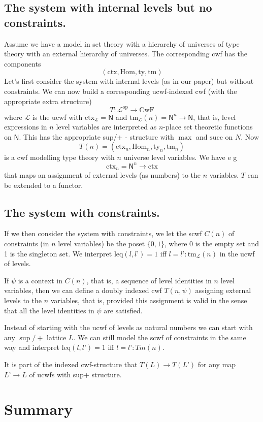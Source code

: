 \documentclass[11pt,a4paper]{article}
\theoremstyle{definition}
\newcommand{\Ctx}{\mathrm{Ctx}}
\newcommand{\Ty}{\mathrm{Ty}}
\newcommand{\Tm}{\mathrm{Tm}}
\newcommand{\op}{\mathrm{op}}
\newcommand{\N}{\mathsf{N}}
\def\Ctx{\mathrm{ctx}}
\def\Ty{\mathrm{ty}}
\def\Tm{\mathrm{tm}}
\def\leq{\mathrm{leq}}
\def\L{{\mathcal{L}}}
\def\CwF{\mathrm{CwF}}
\begin{document}
\subsection{The system with internal levels but no constraints.}
Assume we have a model in set theory with a hierarchy of universes of type theory with an external hierarchy of universes. The corresponding cwf has the components
 $$
(\Ctx, \mathrm{Hom}, \Ty, \Tm)
 $$
Let’s first consider the system with internal levels (as in our paper) but without constraints. We can now build a corresponding ucwf-indexed cwf (with the appropriate extra structure)
 $$
T : \L^{\op} \to \CwF
$$
where $\L$ is the ucwf with $\Ctx_\L = \N$ and $\Tm_\L(n) = \N^n \to \N$, that is, level expressions in $n$ level variables are interpreted as $n$-place set theoretic functions on $\N$. This has the appropriate sup/+ - structure with $\max$ and $\mathrm{succ}$ on $N$. Now
 $$
T(n) = (\Ctx_n, \mathrm{Hom}_n, \Ty_n, \Tm_n)
 $$
is a cwf modelling type theory with $n$ universe level variables. We have e g
 $$
\Ctx_n = \N^n \to \Ctx
 $$
that maps an assignment of external levels (as numbers) to the $n$ variables. $T$ can be extended to a functor.
 
\subsection{The system with constraints.}
If we then consider the system with constraints, we let the scwf $C(n)$ of constraints (in $n$ level variables) be the poset $\{0,1\}$, where 0 is the empty set and 1 is the singleton set. We interpret $\leq(l,l’) = 1$ iff $l = l’ : \Tm_\L(n)$ in the ucwf of levels.
 
If $\psi$ is a context in $C(n)$, that is, a sequence of level identities in $n$ level variables, then we can define a doubly indexed cwf $T(n, \psi)$ assigning external levels to the $n$ variables, that is, provided this assignment is valid in the sense that all the level identities in $\psi$ are satisfied.
 
Instead of starting with the ucwf of levels as natural numbers we can start with any $\sup/+$ lattice $L$.  We can still model the scwf of constraints in the same way and interpret $\leq(l,l’) = 1$ iff $ l = l’ : Tm(n)$.
 
It is part of the indexed cwf-structure that $T(L) \to T(L’)$ for any map $L’ \to L$ of ucwfs with sup+ structure.

\section{Summary}
\end{document}
